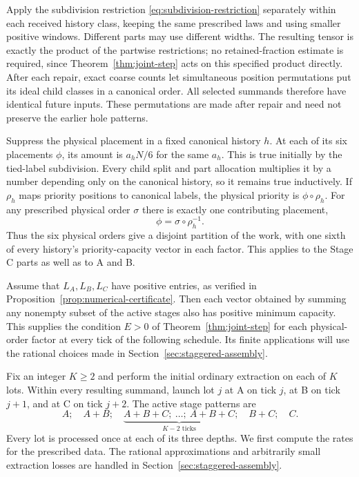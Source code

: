 Apply the subdivision restriction \eqref{eq:subdivision-restriction}
separately within each received history class, keeping the same
prescribed laws and using smaller positive windows.  Different parts may
use different widths.  The resulting tensor is exactly the product of
the partwise restrictions; no retained-fraction estimate is required,
since Theorem~\ref{thm:joint-step} acts on this specified product directly.
After each repair, exact coarse counts let simultaneous position
permutations put its ideal child classes in a canonical order.
All selected summands therefore have identical future inputs.  These
permutations are made after repair and need not preserve the earlier
hole patterns.

Suppress the physical placement in a fixed canonical history $h$.
At each of its six placements $\phi$, its amount is $a_hN/6$ for the
same $a_h$.  This is true initially by the tied-label subdivision.
Every child split and part allocation multiplies it by a number
depending only on the canonical history, so it remains true
inductively.  If $\rho_h$ maps priority positions to canonical labels,
the physical priority is $\phi\circ\rho_h$.  For any prescribed
physical order $\sigma$ there is exactly one contributing placement,
\begin{equation}\label{eq:physical-order-map}
 \phi=\sigma\circ\rho_h^{-1}.
\end{equation}
Thus the six physical orders give a disjoint partition of the work,
with one sixth of every history's priority-capacity vector in each
factor.  This applies to the Stage C parts as well as to A and B.

Assume that $L_A,L_B,L_C$ have positive entries, as verified in
Proposition~\ref{prop:numerical-certificate}.  Then each vector obtained
by summing any nonempty subset of the active stages also has positive
minimum capacity.  This supplies the condition $E>0$ of
Theorem~\ref{thm:joint-step} for each physical-order factor at every
tick of the following schedule.  Its finite applications will use
the rational choices made in Section~\ref{sec:staggered-assembly}.

Fix an integer $K\geq2$ and perform the initial ordinary extraction on
each of $K$ lots.  Within every resulting summand, launch lot $j$ at A
on tick $j$, at B on tick $j+1$, and at C on tick $j+2$.  The active
stage patterns are
\begin{equation}\label{eq:finite-schedule}
 A;\quad A+B;\quad
 \underbrace{A+B+C;\ \ldots;\ A+B+C}_{K-2\text{ ticks}};
 \quad B+C;\quad C.
\end{equation}
Every lot is processed once at each of its three depths.  We first
compute the rates for the prescribed data.  The rational approximations
and arbitrarily small extraction losses are handled in
Section~\ref{sec:staggered-assembly}.

